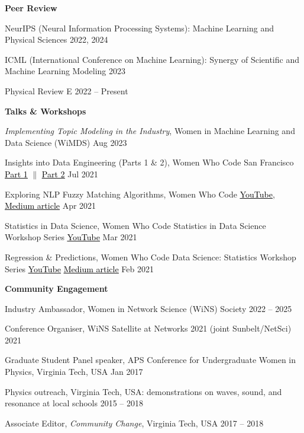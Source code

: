 
\textbf{Peer Review}
\begin{zitemize}
\item NeurIPS (Neural Information Processing Systems): Machine Learning and Physical Sciences \hfill 2022, 2024
\item ICML (International Conference on Machine Learning): Synergy of Scientific and Machine Learning Modeling \hfill 2023
\item Physical Review E \hfill 2022 -- Present
\end{zitemize}

\textbf{Talks \& Workshops}
\begin{zitemize}
\item \textit{Implementing Topic Modeling in the Industry}, Women in Machine Learning and Data Science (WiMDS) \hfill Aug 2023

\item Insights into Data Engineering (Parts 1 \& 2), Women Who Code San Francisco
{\href{https://www.youtube.com/watch?v=CtIw85_wVk8}{\underline{\textcolor{black}{Part 1}}}} $\|$
{\href{https://www.youtube.com/watch?v=rlcSTPSm3lE&t=599s}{\underline{\textcolor{black}{Part 2}}}}
\hfill Jul 2021

\item Exploring NLP Fuzzy Matching Algorithms, Women Who Code
{\href{https://www.youtube.com/watch?v=__Ysw69Hiw0}{\underline{\textcolor{black}{YouTube}}}},
{\href{https://medium.com/@m.nath/fuzzy-matching-algorithms-81914b1bc498}{\underline{\textcolor{black}{Medium article}}}}
\hfill Apr 2021

\item Statistics in Data Science, Women Who Code Statistics in Data Science Workshop Series
{\href{https://www.youtube.com/watch?v=hr1PJFSHGcg}{\underline{\textcolor{black}{YouTube}}}}
\hfill Mar 2021

\item Regression \& Predictions, Women Who Code Data Science: Statistics Workshop Series
{\href{https://www.youtube.com/watch?v=abIdg7tSQuE}{\underline{\textcolor{black}{YouTube}}}}
{\href{https://medium.com/@m.nath/linear-regression-in-r-88507abfe8ab}{\underline{\textcolor{black}{Medium article}}}}
\hfill Feb 2021

\end{zitemize}

\textbf{Community Engagement}
\begin{zitemize}
\item Industry Ambassador, Women in Network Science (WiNS) Society \hfill 2022 -- 2025
\item Conference Organiser, WiNS Satellite at Networks 2021 (joint Sunbelt/NetSci) \hfill 2021
\item Graduate Student Panel speaker, APS Conference for Undergraduate Women in Physics, Virginia Tech, USA \hfill Jan 2017
\item Physics outreach, Virginia Tech, USA: demonstrations on waves, sound, and resonance at local schools \hfill 2015 -- 2018
\item Associate Editor, \textit{Community Change}, Virginia Tech, USA \hfill 2017 -- 2018
\end{zitemize}

